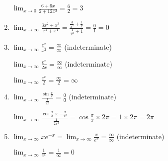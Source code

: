 \documentclass[../main.tex]{subfiles}
\begin{document}
\begin{spacing}{2}
\begin{enumerate}[itemsep=0.7cm]
    $\displaystyle \lim_{x\rightarrow 0}\frac{6+6x}{2+12x^2}=\frac{6}{2}=3$

    \item 
    $\displaystyle \lim_{x\rightarrow \infty}\frac{3x^2+x^3}{x^2+x^4}=\frac{\frac{3}{x^2}+\frac{1}{x}}{\frac{1}{x^2}+1}=\frac{0}{1}=0$

    \item 
    $\displaystyle \lim_{x\rightarrow \infty}\frac{e^x}{x^2}=\frac{\infty}{\infty}$ (indeterminate)

    $\displaystyle \lim_{x\rightarrow \infty}\frac{e^x}{2x}=\frac{\infty}{\infty}$ (indeterminate)

    $\displaystyle \lim_{x\rightarrow \infty}\frac{e^x}{2}=\frac{\infty}{2}=\infty$

    \item 
    $\displaystyle \lim_{x\rightarrow \infty}\frac{\sin{\frac{\pi}{x}}}{\frac{1}{2x}}=\frac{0}{0}$ (indeterminate)

    $\displaystyle \lim_{x\rightarrow \infty}\frac{\cos{\frac{\pi}{x}}\times -\frac{\pi}{x^2}}{-\frac{1}{2x^2}}=\cos{\frac{\pi}{x}}\times 2\pi=1\times 2\pi=2\pi$

    \item 
    $\displaystyle \lim_{x\rightarrow \infty}x e^{-x}=\lim_{x\rightarrow \infty}\frac{x}{e^x}=\frac{\infty}{\infty}$ (indeterminate)

    $\displaystyle \lim_{x\rightarrow \infty}\frac{1}{e^x}=\frac{1}{\infty}=0$


    
\end{enumerate}
\end{spacing}
\end{document}
